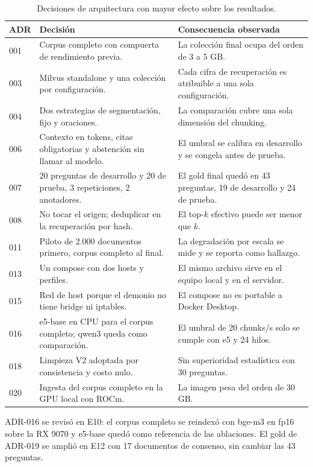 \documentclass[11pt]{tg_usta}
\begin{document}
\begin{table}[htbp]
\centering
\footnotesize
\begin{tabular}{@{}p{0.9cm}p{7.6cm}p{6.2cm}@{}}
\toprule
ADR & Decisión & Consecuencia observada \\
\midrule
001 & Corpus completo con compuerta de rendimiento previa. & La colección final ocupa del orden de 3 a 5 GB. \\
003 & Milvus standalone y una colección por configuración. & Cada cifra de recuperación es atribuible a una sola configuración. \\
004 & Dos estrategias de segmentación, fijo y oraciones. & La comparación cubre una sola dimensión del chunking. \\
006 & Contexto en tokens, citas obligatorias y abstención sin llamar al modelo. & El umbral se calibra en desarrollo y se congela antes de prueba. \\
007 & 20 preguntas de desarrollo y 20 de prueba, 3 repeticiones, 2 anotadores. & El gold final quedó en 43 preguntas, 19 de desarrollo y 24 de prueba. \\
008 & No tocar el origen; deduplicar en la recuperación por hash. & El top-$k$ efectivo puede ser menor que $k$. \\
011 & Piloto de 2.000 documentos primero, corpus completo al final. & La degradación por escala se mide y se reporta como hallazgo. \\
013 & Un compose con dos hosts y perfiles. & El mismo archivo sirve en el equipo local y en el servidor. \\
015 & Red de host porque el demonio no tiene bridge ni iptables. & El compose no es portable a Docker Desktop. \\
016 & e5-base en CPU para el corpus completo; qwen3 queda como comparación. & El umbral de 20 chunks/s solo se cumple con e5 y 24 hilos. \\
018 & Limpieza V2 adoptada por consistencia y costo nulo. & Sin superioridad estadística con 30 preguntas. \\
020 & Ingesta del corpus completo en la GPU local con ROCm. & La imagen pesa del orden de 30 GB. \\
\bottomrule
\end{tabular}
\caption{Decisiones de arquitectura con mayor efecto sobre los resultados.}
\label{tab:adr}
\end{table}

ADR-016 se revisó en E10: el corpus completo se reindexó con bge-m3 en fp16 sobre la RX 9070 y e5-base quedó como referencia de las ablaciones. El gold de ADR-019 se amplió en E12 con 17 documentos de consenso, sin cambiar las 43 preguntas.
\end{document}
